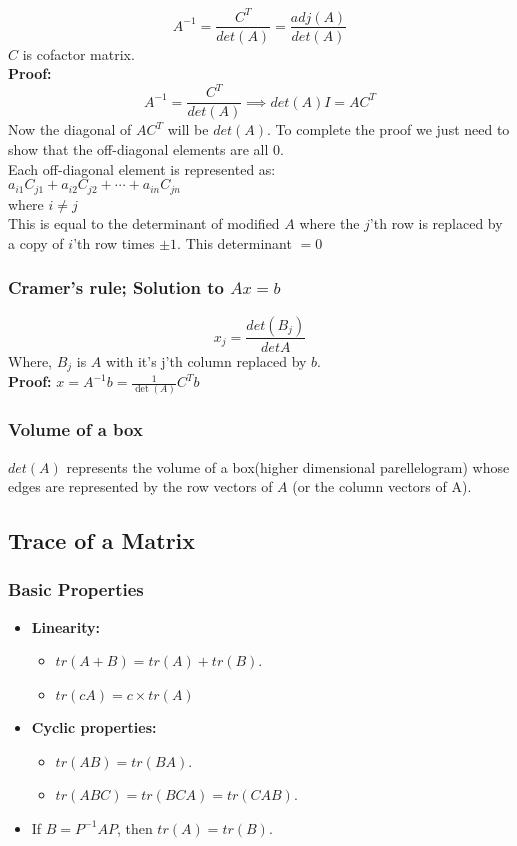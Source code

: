 $$A^{-1} = \frac{C^T}{det(A)} = \frac{adj(A)}{det(A)}$$
$C$ is cofactor matrix.\\
\textbf{Proof:}\\
$$A^{-1} = \frac{C^T}{det(A)} \implies det(A)I = AC^T$$
Now the diagonal of $AC^T$ will be $det(A)$. To complete the proof we just need to show that the
off-diagonal elements are all 0.\\
Each off-diagonal element is represented as:\\
$a_{i1}C_{j1} + a_{i2}C_{j2} + \cdots + a_{in}C_{jn}$\\
where $i \neq j$\\
This is equal to the determinant of modified $A$ where the $j$'th row 
is replaced by a copy of $i$'th row times $\pm 1$. This determinant $ = 0$\\

\subsubsection{Cramer's rule; Solution to $Ax = b$}

$$x_j = \frac{det(B_j)}{det A}$$
Where, $B_j$ is $A$ with it's j'th column replaced by $b$.\\
\textbf{Proof:} $x = A^{-1}b = \frac{1}{\det(A)}C^Tb$

\subsubsection{Volume of a box}
$det(A)$ represents the volume of a box(higher dimensional parellelogram) whose edges are represented by the row vectors of $A$ (or the column vectors of A).

\subsection{Trace of a Matrix}

\subsubsection*{Basic Properties}

\begin{itemize}
\item \textbf{Linearity:}
    \begin{itemize}
        \item $tr(A + B) = tr(A) + tr(B)$.
        \item $tr(cA) = c \times tr(A)$
    \end{itemize}
\item \textbf{Cyclic properties:}
    \begin{itemize}
        \item $tr(AB) = tr(BA)$.
        \item $tr(ABC) = tr(BCA) = tr(CAB)$.
    \end{itemize}
\item If $B = P^{-1}AP$, then $tr(A) = tr(B)$.
\end{itemize}